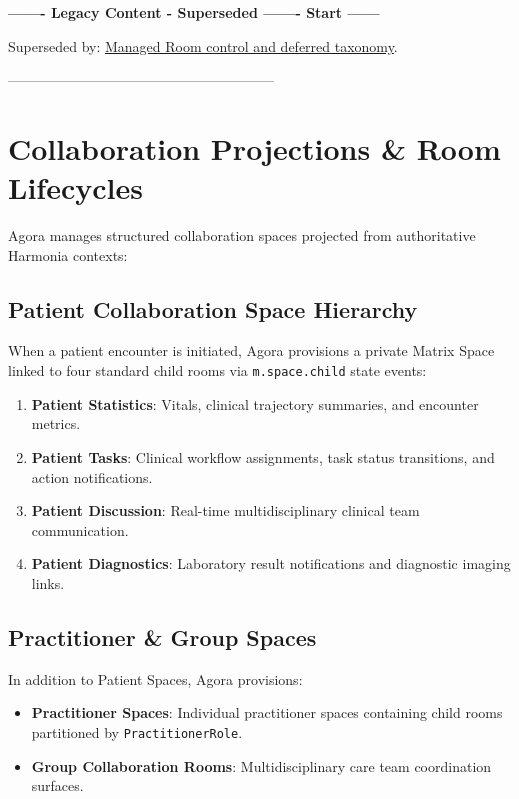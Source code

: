 \par\noindent\textbf{------- Legacy Content - Superseded ------- Start ------}
\par\noindent Superseded by: \href{../../markdown/05-information-systems-architecture/agora-omilia-collaboration.md\#control-and-operations}{Managed Room control and deferred taxonomy}.
\par\noindent ---------------------------------------------------------

\section{Collaboration Projections \& Room Lifecycles}

Agora manages structured collaboration spaces projected from authoritative Harmonia contexts:

\subsection{Patient Collaboration Space Hierarchy}
When a patient encounter is initiated, Agora provisions a private Matrix Space linked to four standard child rooms via \nolinkurl{m.space.child} state events:
\begin{enumerate}
    \item \textbf{Patient Statistics}: Vitals, clinical trajectory summaries, and encounter metrics.
    \item \textbf{Patient Tasks}: Clinical workflow assignments, task status transitions, and action notifications.
    \item \textbf{Patient Discussion}: Real-time multidisciplinary clinical team communication.
    \item \textbf{Patient Diagnostics}: Laboratory result notifications and diagnostic imaging links.
\end{enumerate}

\subsection{Practitioner \& Group Spaces}
In addition to Patient Spaces, Agora provisions:
\begin{itemize}
    \item \textbf{Practitioner Spaces}: Individual practitioner spaces containing child rooms partitioned by \nolinkurl{PractitionerRole}.
    \item \textbf{Group Collaboration Rooms}: Multidisciplinary care team coordination surfaces.
\end{itemize}


